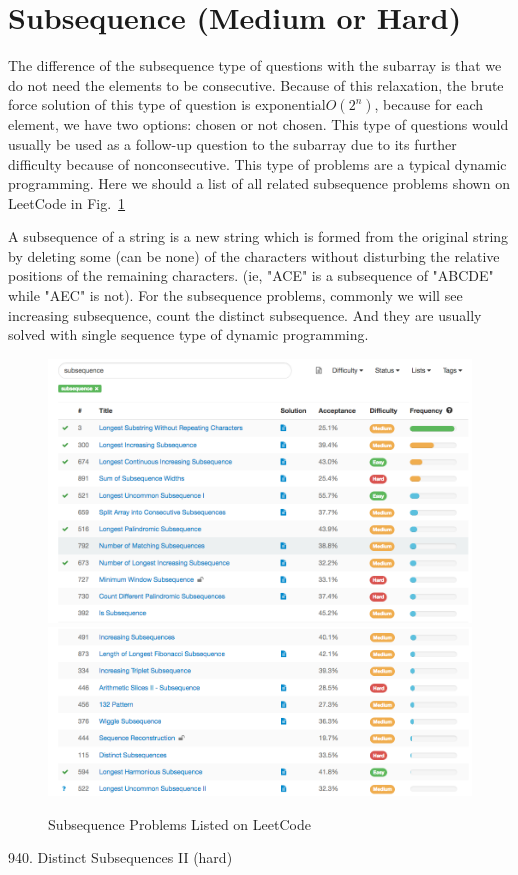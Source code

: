 \documentclass[../../../main.tex]{subfiles}
\begin{document}
\section{Subsequence (Medium or Hard)}
The difference of the subsequence type of questions with the subarray is that we do not need the elements to be consecutive. Because of this relaxation, the brute force solution of this type of question is exponential$O(2^n)$, because for each element, we have two options: chosen or not chosen. This type of questions would usually be used as a follow-up question to the subarray due to its further difficulty because of nonconsecutive. This type of problems are a typical dynamic programming. Here we should a list of all related subsequence problems shown on LeetCode in Fig.~\ref{fig:subsequence_problems}

A subsequence of a string is a new string which is formed from the original string by deleting some (can be none) of the characters without disturbing the relative positions of the remaining characters. (ie, "ACE" is a subsequence of "ABCDE" while "AEC" is not). For the subsequence problems, commonly we will see increasing subsequence, count the distinct subsequence. And they are usually solved with single sequence type of dynamic programming. 
\begin{figure}[h]
    \centering
    \includegraphics[width=0.8\columnwidth]{fig/subsequence_1.png}
    \includegraphics[width=0.8\columnwidth]{fig/subsequence_2.png}
    \caption{Subsequence Problems Listed on LeetCode}
    \label{fig:subsequence_problems}
\end{figure}
940. Distinct Subsequences II (hard)
\end{document}
